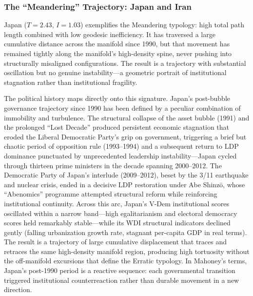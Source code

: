 \documentclass[12pt]{article}
\begin{document}
\subsubsection{The ``Meandering'' Trajectory: Japan and Iran}

Japan ($T = 2.43$, $I = 1.03$) exemplifies the Meandering typology: high total path length combined with low geodesic inefficiency. It has traversed a large cumulative distance across the manifold since 1990, but that movement has remained tightly along the manifold's high-density spine, never pushing into structurally misaligned configurations. The result is a trajectory with substantial oscillation but no genuine instability---a geometric portrait of institutional stagnation rather than institutional fragility.

The political history maps directly onto this signature. Japan's post-bubble governance trajectory since 1990 has been defined by a peculiar combination of immobility and turbulence. The structural collapse of the asset bubble (1991) and the prolonged ``Lost Decade'' produced persistent economic stagnation that eroded the Liberal Democratic Party's grip on government, triggering a brief but chaotic period of opposition rule (1993--1994) and a subsequent return to LDP dominance punctuated by unprecedented leadership instability---Japan cycled through thirteen prime ministers in the decade spanning 2000--2012. The Democratic Party of Japan's interlude (2009--2012), beset by the 3/11 earthquake and nuclear crisis, ended in a decisive LDP restoration under Abe Shinz\=o, whose ``Abenomics'' programme attempted structural reform while reinforcing institutional continuity. Across this arc, Japan's V-Dem institutional scores oscillated within a narrow band---high egalitarianism and electoral democracy scores held remarkably stable---while its WDI structural indicators declined gently (falling urbanization growth rate, stagnant per-capita GDP in real terms). The result is a trajectory of large cumulative displacement that traces and retraces the same high-density manifold region, producing high tortuosity without the off-manifold excursions that define the Erratic typology. In Mahoney's \cite{mahoney2000pathdependence} terms, Japan's post-1990 period is a reactive sequence: each governmental transition triggered institutional counterreaction rather than durable movement in a new direction.
\end{document}
